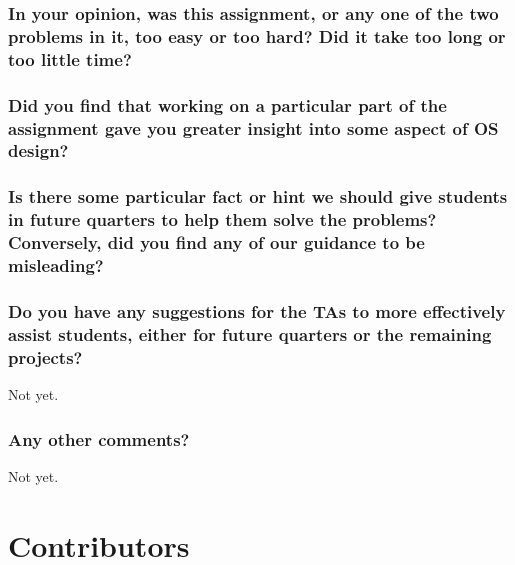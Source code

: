 \documentclass[sigconf, nonacm, balance=false, urlbreakonhyphens=true]{acmart}
\begin{document}
        \subsubsection*{In your opinion, was this assignment, or any one of the two problems in it, too easy or too hard? Did it take too long or too little time? }

        \subsubsection*{Did you find that working on a particular part of the assignment gave you greater insight into some aspect of OS design? }

        \subsubsection*{Is there some particular fact or hint we should give students in future quarters to help them solve the problems? Conversely, did you find any of our guidance to be misleading? }

        \subsubsection*{Do you have any suggestions for the TAs to more effectively assist students, either for future quarters or the remaining projects? }

            Not yet. 

        \subsubsection*{Any other comments? }

            Not yet. 
    
    \section*{Contributors}
\end{document}
